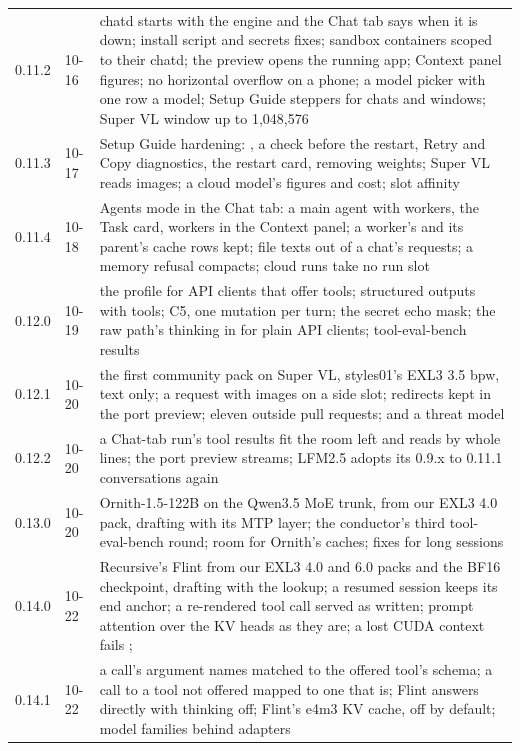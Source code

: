 \begin{table}[htbp]
\begin{tabularx}{\linewidth}{@{}L{.2\linewidth}L{.15\linewidth}Y@{}}
0.11.2 & 10-16 & chatd starts with the engine and the Chat tab says when it is down; install script and secrets fixes; sandbox containers scoped to their chatd; the preview opens the running app; Context panel figures; no horizontal overflow on a phone; a model picker with one row a model; Setup Guide steppers for chats and windows; Super VL window up to 1,048,576 \\
0.11.3 & 10-17 & Setup Guide hardening: , a check before the restart, Retry and Copy diagnostics, the restart card, removing weights; Super VL reads images; a cloud model's figures and cost; slot affinity \\
0.11.4 & 10-18 & Agents mode in the Chat tab: a main agent with workers, the Task card, workers in the Context panel; a worker's and its parent's cache rows kept; file texts out of a chat's requests; a memory refusal compacts; cloud runs take no run slot \\
0.12.0 & 10-19 & the  profile for API clients that offer tools; structured outputs with tools; C5, one mutation per turn; the secret echo mask; the raw path's thinking in  for plain API clients; tool-eval-bench results \\
0.12.1 & 10-20 & the first community pack on Super VL, styles01's EXL3 3.5 bpw, text only; a request with images on a side slot; redirects kept in the port preview; eleven outside pull requests;  and a threat model \\
0.12.2 & 10-20 & a Chat-tab run's tool results fit the room left and  reads by whole lines; the port preview streams; LFM2.5 adopts its 0.9.x to 0.11.1 conversations again \\
0.13.0 & 10-20 & Ornith-1.5-122B on the Qwen3.5 MoE trunk, from our EXL3 4.0 pack, drafting with its MTP layer; the conductor's third tool-eval-bench round; room for Ornith's caches;  fixes for long sessions \\
0.14.0 & 10-22 & Recursive's Flint from our EXL3 4.0 and 6.0 packs and the BF16 checkpoint, drafting with the lookup; a resumed session keeps its end anchor; a re-rendered tool call served as written; prompt attention over the KV heads as they are; a lost CUDA context fails ;  \\
0.14.1 & 10-22 & a call's argument names matched to the offered tool's schema; a call to a tool not offered mapped to one that is; Flint answers directly with thinking off; Flint's e4m3 KV cache, off by default; model families behind adapters \\

\end{tabularx}
\end{table}
